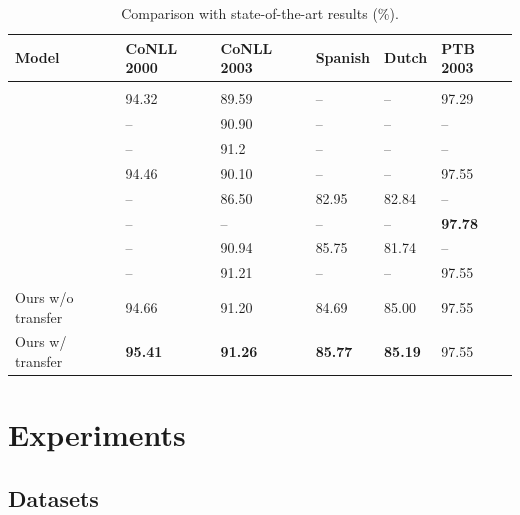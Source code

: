 \begin{table}[t]
\caption{\small Comparison with state-of-the-art results (\%).}
\label{tab:sota}
\begin{center}
\begin{tabular}{llllll}
Model & CoNLL 2000 & CoNLL 2003 & Spanish & Dutch & PTB 2003
\\ \hline \\
\cite{collobert2011natural} & 94.32 & 89.59 & -- & -- & 97.29 \\
\cite{passos2014lexicon} & -- & 90.90 & -- & -- & -- \\
\cite{luo2015joint} & -- & 91.2 & -- & -- & -- \\
\cite{huang2015bidirectional} & 94.46 & 90.10 & -- & -- & 97.55 \\
\cite{gillick2015multilingual} & -- & 86.50 & 82.95 & 82.84 & -- \\
\cite{ling2015finding} & -- & -- & -- & -- & \textbf{97.78} \\
\cite{lample2016neural} & -- & 90.94 & 85.75 & 81.74 & -- \\
\cite{ma2016end} & -- & 91.21 & -- & -- & 97.55 \\
\hline
Ours w/o transfer & 94.66 & 91.20 & 84.69 & 85.00 & 97.55 \\
Ours w/ transfer & \textbf{95.41} & \textbf{91.26} & \textbf{85.77} & \textbf{85.19} & 97.55 \\
\end{tabular}
\end{center}
\vspace{-0.1in}
\end{table}

\section{Experiments}

\subsection{Datasets}


